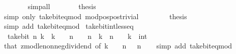 \begin{isabellebody}
\ \ \ \ \ \ \isamarkupfalse%
\ simp{\isacharunderscore}{\kern0pt}all\isanewline
\ \ \ \ \isamarkupfalse%
\ \isamarkupfalse%
\ {\isacharquery}{\kern0pt}thesis\isanewline
\ \ \ \ \ \ \isamarkupfalse%
\ {\isacharparenleft}{\kern0pt}simp\ only{\isacharcolon}{\kern0pt}\ take{\isacharunderscore}{\kern0pt}bit{\isacharunderscore}{\kern0pt}eq{\isacharunderscore}{\kern0pt}mod\ mod{\isacharunderscore}{\kern0pt}pos{\isacharunderscore}{\kern0pt}pos{\isacharunderscore}{\kern0pt}trivial{\isacharparenright}{\kern0pt}\isanewline
\ \ \isamarkupfalse%
\isanewline
\ \ \isamarkupfalse%
\ \isamarkupfalse%
\ {\isacharquery}{\kern0pt}thesis\isanewline
\ \ \ \ \isamarkupfalse%
\ {\isacharparenleft}{\kern0pt}simp\ add{\isacharcolon}{\kern0pt}\ take{\isacharunderscore}{\kern0pt}bit{\isacharunderscore}{\kern0pt}eq{\isacharunderscore}{\kern0pt}mod{\isacharparenright}{\kern0pt}\isanewline
{}\isamarkupfalse%
%
\endisatagproof
{\isafoldproof}%
%
\isadelimproof
\isanewline
%
\endisadelimproof
\isanewline
{}\isamarkupfalse%
\ take{\isacharunderscore}{\kern0pt}bit{\isacharunderscore}{\kern0pt}int{\isacharunderscore}{\kern0pt}less{\isacharunderscore}{\kern0pt}eq{\isacharcolon}{\kern0pt}\isanewline
\ \ {\isacartoucheopen}take{\isacharunderscore}{\kern0pt}bit\ n\ k\ {\isasymle}\ k\ {\isacharminus}{\kern0pt}\ {}\ {\isacharcircum}{\kern0pt}\ n{\isacartoucheclose}\ \ {\isacartoucheopen}{}\ {\isacharcircum}{\kern0pt}\ n\ {\isasymle}\ k{\isacartoucheclose}\ \ {\isacartoucheopen}n\ {\isachargreater}{\kern0pt}\ {}{\isacartoucheclose}\ \ k\ {\isacharcolon}{\kern0pt}{\isacharcolon}{\kern0pt}\ int\isanewline
%
\isadelimproof
\ \ %
\endisadelimproof
%
\isatagproof
{}\isamarkupfalse%
\ that\ zmod{\isacharunderscore}{\kern0pt}le{\isacharunderscore}{\kern0pt}nonneg{\isacharunderscore}{\kern0pt}dividend\ {\isacharbrackleft}{\kern0pt}of\ {\isacartoucheopen}k\ {\isacharminus}{\kern0pt}\ {}\ {\isacharcircum}{\kern0pt}\ n{\isacartoucheclose}\ {\isacartoucheopen}{}\ {\isacharcircum}{\kern0pt}\ n{\isacartoucheclose}{\isacharbrackright}{\kern0pt}\isanewline
\ \ \isamarkupfalse%
\ {\isacharparenleft}{\kern0pt}simp\ add{\isacharcolon}{\kern0pt}\ take{\isacharunderscore}{\kern0pt}bit{\isacharunderscore}{\kern0pt}eq{\isacharunderscore}{\kern0pt}mod{\isacharparenright}{\kern0pt}%
\endisatagproof
{\isafoldproof}%
%
\isadelimproof

\end{isabellebody}

